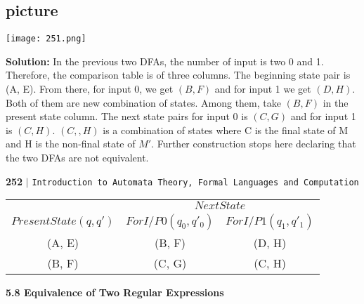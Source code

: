 \documentclass{article}
\begin{document}
\begin{center}
  \section{picture}
\texttt{[image: 251.png]}
\end{center}

\textbf{Solution:} In the previous two DFAs, the number of input is two 0 and 1. Therefore, the comparison
table is of three columns. The beginning state pair is (A, E). From there, for input 0, we get $(B, F)$ and
for input 1 we get $(D, H)$. Both of them are new combination of states. Among them, take $(B, F)$ in the
present state column. The next state pairs for input 0 is $(C, G)$ and for input 1 is $(C, H)$. $(C,,H)$ is a combination
of states where C is the final state of M and H is the non-final state of $M'$. Further construction
stops here declaring that the two DFAs are not equivalent.\\

\newpage
\begin{flushleft}
    \textbf{252}\hspace*{0.1cm} \textbf{$|$} \hspace*{0.1cm} \texttt{Introduction to Automata Theory, Formal Languages and Computation}
  \end{flushleft}

  \vspace*{0.5cm}
  \begin{center}
\begin{tabular}{ccc}
 \hline

 \hline

 \hline

 \hline
 & \multicolumn{2}{c}{$Next State$}\\
 \cline{2-3}
 $Present State (q, q')$ &  $For I/P 0 (q_0, q'_0)$ & $For I/P 1 (q_1, q'_1)$\\
\hline
(A, E) & (B, F) & (D, H)\\
(B, F) & (C, G) & (C, H)\\
 \hline

 \hline

 \hline

 \hline
\end{tabular}
\end{center}

\vspace*{0.4cm}

\large{
\textbf{5.8 Equivalence of Two Regular Expressions}
}
\end{document}
